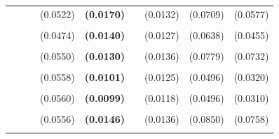 \documentclass[
  12pt,
]{article}
\begin{document}
\begin{table}[H]
{\begin{tabular}[t]{llll>{}lllll}
 &  &  & (0.0522) & \textbf{(0.0170)} &  & (0.0132) & (0.0709) & (0.0577)\\
\addlinespace
\cellcolor{gray!6}{c.quad} & \cellcolor{gray!6}{6.1997} & \cellcolor{gray!6}{1.1264} & \cellcolor{gray!6}{0.4654} & \textbf{\cellcolor{gray!6}{0.5334}} & \cellcolor{gray!6}{-6.4882} & \cellcolor{gray!6}{0.7456} & \cellcolor{gray!6}{0.1944} & \cellcolor{gray!6}{0.5938}\\
 &  &  & (0.0474) & \textbf{(0.0140)} &  & (0.0127) & (0.0638) & (0.0455)\\
\addlinespace
\cellcolor{gray!6}{c.hamilton13.panelr15} & \cellcolor{gray!6}{-1.6660} & \cellcolor{gray!6}{-6.7393} & \cellcolor{gray!6}{0.5087} & \textbf{\cellcolor{gray!6}{0.5274}} & \cellcolor{gray!6}{-1.1064} & \cellcolor{gray!6}{0.7002} & \cellcolor{gray!6}{0.3333} & \cellcolor{gray!6}{0.6014}\\
 &  &  & (0.0550) & \textbf{(0.0130)} &  & (0.0136) & (0.0779) & (0.0732)\\
\addlinespace
\cellcolor{gray!6}{c.hp25k.r15} & \cellcolor{gray!6}{3.6420} & \cellcolor{gray!6}{-1.4313} & \cellcolor{gray!6}{0.5018} & \textbf{\cellcolor{gray!6}{0.5265}} & \cellcolor{gray!6}{-3.5672} & \cellcolor{gray!6}{0.7850} & \cellcolor{gray!6}{0.1111} & \cellcolor{gray!6}{0.6285}\\
 &  &  & (0.0558) & \textbf{(0.0101)} &  & (0.0125) & (0.0496) & (0.0320)\\
\addlinespace
\cellcolor{gray!6}{c.hp25k} & \cellcolor{gray!6}{3.9466} & \cellcolor{gray!6}{-1.1267} & \cellcolor{gray!6}{0.4975} & \textbf{\cellcolor{gray!6}{0.5247}} & \cellcolor{gray!6}{-3.7339} & \cellcolor{gray!6}{0.7893} & \cellcolor{gray!6}{0.1111} & \cellcolor{gray!6}{0.6354}\\
 &  &  & (0.0560) & \textbf{(0.0099)} &  & (0.0118) & (0.0496) & (0.0310)\\
\addlinespace
\cellcolor{gray!6}{c.hp3k} & \cellcolor{gray!6}{3.3678} & \cellcolor{gray!6}{-1.7054} & \cellcolor{gray!6}{0.5276} & \textbf{\cellcolor{gray!6}{0.5235}} & \cellcolor{gray!6}{-1.1119} & \cellcolor{gray!6}{0.7019} & \cellcolor{gray!6}{0.3333} & \cellcolor{gray!6}{0.6038}\\
 &  &  & (0.0556) & \textbf{(0.0146)} &  & (0.0136) & (0.0850) & (0.0758)\\
\addlinespace
\cellcolor{gray!6}{c.hp3k.r20} & \cellcolor{gray!6}{3.3703} & \cellcolor{gray!6}{-1.7030} & \cellcolor{gray!6}{0.5276} & \textbf{\cellcolor{gray!6}{0.5235}} & \cellcolor{gray!6}{-1.1125} & \cellcolor{gray!6}{0.7028} & \cellcolor{gray!6}{0.3333} & \cellcolor{gray!6}{0.6050}\\

\end{tabular}}
\end{table}
\end{document}
